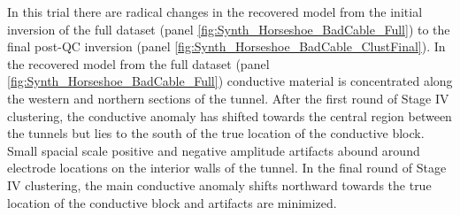 \documentclass[final,authoryear,5p,times,twocolumn]{elsarticle}
\begin{document}
In this trial there are radical changes in the recovered model from the initial inversion of the full dataset (panel \ref{fig:Synth_Horseshoe_BadCable_Full}) to the final post-QC inversion (panel \ref{fig:Synth_Horseshoe_BadCable_ClustFinal}). In the recovered model from the full dataset (panel \ref{fig:Synth_Horseshoe_BadCable_Full}) conductive material is concentrated along the western and northern sections of the tunnel. After the first round of Stage IV clustering, the conductive anomaly has shifted towards the central region between the tunnels but lies to the south of the true location of the conductive block. Small spacial scale positive and negative amplitude artifacts abound around electrode locations on the interior walls of the tunnel. In the final round of Stage IV clustering, the main conductive anomaly shifts northward towards the true location of the conductive block and artifacts are minimized.
\end{document}
